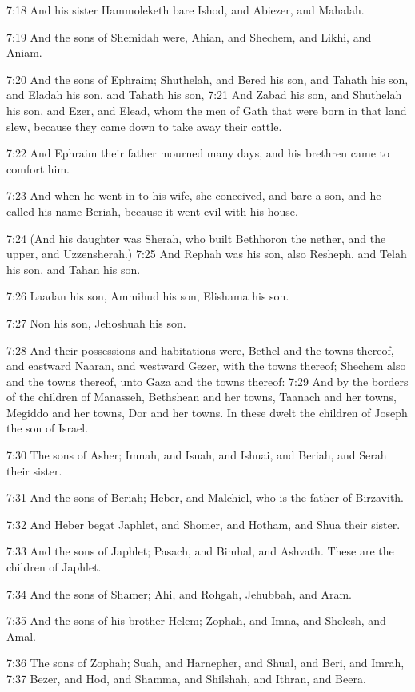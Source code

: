 7:18 And his sister Hammoleketh bare Ishod, and Abiezer, and Mahalah.

7:19 And the sons of Shemidah were, Ahian, and Shechem, and Likhi, and Aniam.

7:20 And the sons of Ephraim; Shuthelah, and Bered his son, and Tahath his son, and Eladah his son, and Tahath his son, 7:21 And Zabad his son, and Shuthelah his son, and Ezer, and Elead, whom the men of Gath that were born in that land slew, because they came down to take away their cattle.

7:22 And Ephraim their father mourned many days, and his brethren came to comfort him.

7:23 And when he went in to his wife, she conceived, and bare a son, and he called his name Beriah, because it went evil with his house.

7:24 (And his daughter was Sherah, who built Bethhoron the nether, and the upper, and Uzzensherah.)  7:25 And Rephah was his son, also Resheph, and Telah his son, and Tahan his son.

7:26 Laadan his son, Ammihud his son, Elishama his son.

7:27 Non his son, Jehoshuah his son.

7:28 And their possessions and habitations were, Bethel and the towns thereof, and eastward Naaran, and westward Gezer, with the towns thereof; Shechem also and the towns thereof, unto Gaza and the towns thereof: 7:29 And by the borders of the children of Manasseh, Bethshean and her towns, Taanach and her towns, Megiddo and her towns, Dor and her towns. In these dwelt the children of Joseph the son of Israel.

7:30 The sons of Asher; Imnah, and Isuah, and Ishuai, and Beriah, and Serah their sister.

7:31 And the sons of Beriah; Heber, and Malchiel, who is the father of Birzavith.

7:32 And Heber begat Japhlet, and Shomer, and Hotham, and Shua their sister.

7:33 And the sons of Japhlet; Pasach, and Bimhal, and Ashvath. These are the children of Japhlet.

7:34 And the sons of Shamer; Ahi, and Rohgah, Jehubbah, and Aram.

7:35 And the sons of his brother Helem; Zophah, and Imna, and Shelesh, and Amal.

7:36 The sons of Zophah; Suah, and Harnepher, and Shual, and Beri, and Imrah, 7:37 Bezer, and Hod, and Shamma, and Shilshah, and Ithran, and Beera.

